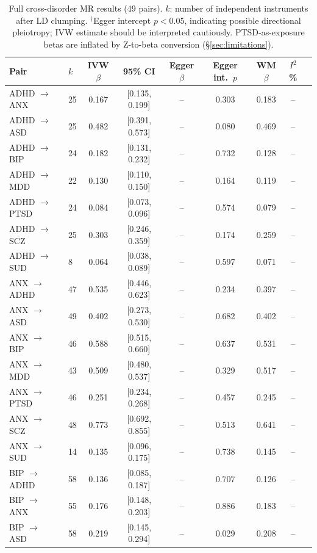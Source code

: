 \documentclass{article}
\begin{document}
\begin{table}[h]
\centering
\caption{Full cross-disorder MR results (49 pairs). $k$: number of independent instruments after LD clumping. $^{\dagger}$Egger intercept $p < 0.05$, indicating possible directional pleiotropy; IVW estimate should be interpreted cautiously. PTSD-as-exposure betas are inflated by Z-to-beta conversion (\S\ref{sec:limitations}).}
\label{tab:mr_full}
\footnotesize
\begin{tabular}{llccccccc}
\toprule
Pair & $k$ & IVW $\beta$ & 95\% CI & Egger $\beta$ & Egger int.\ $p$ & WM $\beta$ & $I^2$\% \\
\midrule
ADHD $\to$ ANX & 25 & 0.167 & [0.135, 0.199] & -- & 0.303 & 0.183 & -- \\
ADHD $\to$ ASD & 25 & 0.482 & [0.391, 0.573] & -- & 0.080 & 0.469 & -- \\
ADHD $\to$ BIP & 24 & 0.182 & [0.131, 0.232] & -- & 0.732 & 0.128 & -- \\
ADHD $\to$ MDD & 22 & 0.130 & [0.110, 0.150] & -- & 0.164 & 0.119 & -- \\
ADHD $\to$ PTSD & 24 & 0.084 & [0.073, 0.096] & -- & 0.574 & 0.079 & -- \\
ADHD $\to$ SCZ & 25 & 0.303 & [0.246, 0.359] & -- & 0.174 & 0.259 & -- \\
ADHD $\to$ SUD & 8 & 0.064 & [0.038, 0.089] & -- & 0.597 & 0.071 & -- \\
\midrule
ANX $\to$ ADHD & 47 & 0.535 & [0.446, 0.623] & -- & 0.234 & 0.397 & -- \\
ANX $\to$ ASD & 49 & 0.402 & [0.273, 0.530] & -- & 0.682 & 0.402 & -- \\
ANX $\to$ BIP & 46 & 0.588 & [0.515, 0.660] & -- & 0.637 & 0.531 & -- \\
ANX $\to$ MDD & 43 & 0.509 & [0.480, 0.537] & -- & 0.329 & 0.517 & -- \\
ANX $\to$ PTSD & 46 & 0.251 & [0.234, 0.268] & -- & 0.457 & 0.245 & -- \\
ANX $\to$ SCZ & 48 & 0.773 & [0.692, 0.855] & -- & 0.513 & 0.641 & -- \\
ANX $\to$ SUD & 14 & 0.135 & [0.096, 0.175] & -- & 0.738 & 0.145 & -- \\
\midrule
BIP $\to$ ADHD & 58 & 0.136 & [0.085, 0.187] & -- & 0.707 & 0.126 & -- \\
BIP $\to$ ANX & 55 & 0.176 & [0.148, 0.203] & -- & 0.886 & 0.183 & -- \\
BIP $\to$ ASD & 58 & 0.219 & [0.145, 0.294] & -- & 0.029 & 0.208 & -- \\

\end{tabular}
\end{table}
\end{document}
